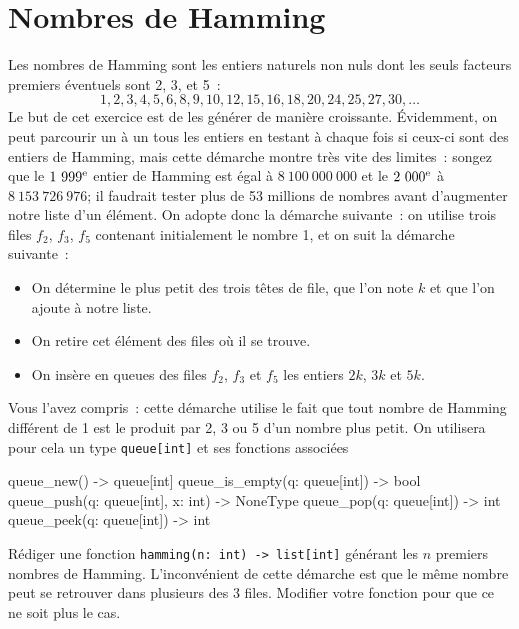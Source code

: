 \documentclass{magnolia}
\begin{document}
\section{Nombres de Hamming}
Les nombres de Hamming sont les entiers naturels non nuls dont les seuls facteurs premiers éventuels
sont 2, 3, et 5~:
\[1, 2, 3, 4, 5, 6, 8, 9, 10, 12, 15, 16, 18, 20, 24, 25, 27, 30, \ldots\]
Le but de cet exercice est de les générer de manière croissante. Évidemment, on peut parcourir un à un
tous les entiers en testant à chaque fois si ceux-ci sont des entiers de Hamming, mais cette démarche
montre très vite des limites~: songez que le $1\ 999^{\rm e}$ entier de Hamming est égal à $8\ 100\ 000\ 000$
et le $2\ 000^{\rm e}$ à $8\ 153\ 726\ 976$; il faudrait tester plus de 53 millions de nombres avant
d'augmenter notre liste d'un élément. On adopte donc la démarche suivante~: on utilise trois files
$f_2$, $f_3$, $f_5$ contenant initialement le nombre 1, et on suit la démarche suivante~:
\begin{itemize}
\item On détermine le plus petit des trois têtes de file, que l'on note $k$ et que l'on ajoute à notre liste.
\item On retire cet élément des files où il se trouve.
\item On insère en queues des files $f_2$, $f_3$ et $f_5$ les entiers $2k$, $3k$ et $5k$.
\end{itemize}
Vous l'avez compris~: cette démarche utilise le fait que tout nombre de Hamming différent de 1 est le produit
par 2, 3 ou 5 d'un nombre plus petit. On utilisera pour cela un type \verb!queue[int]! et ses fonctions associées
\begin{pythoncode}
queue_new() -> queue[int]
queue_is_empty(q: queue[int]) -> bool
queue_push(q: queue[int], x: int) -> NoneType
queue_pop(q: queue[int]) -> int
queue_peek(q: queue[int]) -> int
\end{pythoncode}

\begin{questions}
\question Rédiger une fonction \verb!hamming(n: int) -> list[int]! générant les $n$ premiers nombres de Hamming.
\question L'inconvénient de cette démarche est que le même nombre peut se retrouver dans plusieurs des 3 files.
  Modifier votre fonction pour que ce ne soit plus le cas.
\end{questions}

\end{document}
